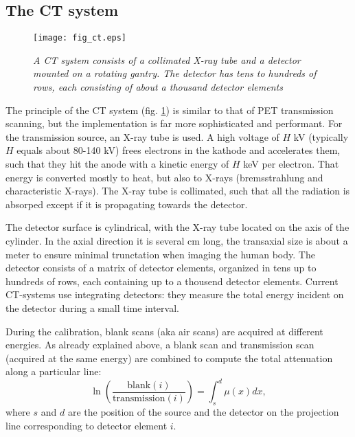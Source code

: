 \subsection{The CT system}
\begin{figure}[tbp]
\centering \texttt{[image: fig\_ct.eps]} 
\caption{\label{fig:ct} \emph{A CT system consists of a collimated
    X-ray tube and a detector mounted on a rotating gantry. The
    detector has tens to hundreds of rows, each consisting of about a
    thousand detector elements}}
\end{figure}
%
The principle of the CT system (fig. \ref{fig:ct}) is similar to that
of PET transmission scanning, but the implementation is far more
sophisticated and performant. For the transmission source, an X-ray
tube is used. A high voltage of $H$ kV (typically $H$ equals about
80-140 kV) frees electrons in the kathode and accelerates them, such
that they hit the anode with a kinetic energy of $H$ keV per electron.
That energy is converted mostly to heat, but also to X-rays
(bremsstrahlung and characteristic X-rays). The X-ray tube is
collimated, such that all the radiation is absorped except if it is
propagating towards the detector.

The detector surface is cylindrical, with the X-ray tube located on
the axis of the cylinder. In the axial direction it is several cm
long, the transaxial size is about a meter to ensure minimal
trunctation when imaging the human body. The detector consists of a
matrix of detector elements, organized in tens up to hundreds of rows,
each containing up to a thousend detector elements. Current CT-systems
use integrating detectors: they measure the total energy incident on
the detector during a small time interval.

During the calibration, blank scans (aka air scans) are acquired at
different energies. As already explained above, a blank scan and
transmission scan (acquired at the same energy) are combined to
compute the total attenuation along a particular line:
\begin{equation}
  \ln\left(\frac{\mbox{blank}(i)}{\mbox{transmission}(i)}\right) 
     = \int_s^d \mu(x) dx, \label{eq:totatten}
\end{equation}
where $s$ and $d$ are the position of the source and the detector on
the projection line corresponding to detector element $i$.

